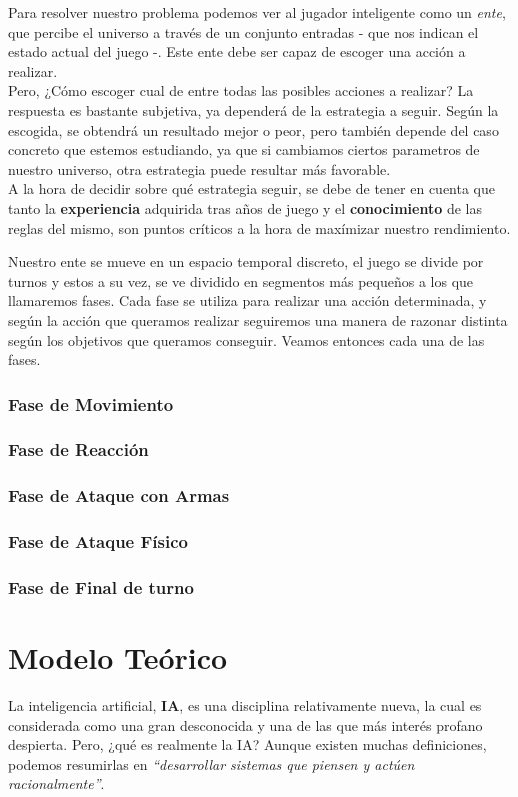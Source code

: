 \documentclass[a4paper,12pt,oneside]{book}
\begin{document}
Para resolver nuestro problema podemos ver al jugador inteligente como
un {\it ente}, que percibe el universo a través de un conjunto
entradas - que nos indican el estado actual del juego -. Este ente
debe ser capaz de escoger una acción a realizar.\\

Pero, ¿Cómo escoger cual de entre todas las posibles acciones a
realizar? La respuesta es bastante subjetiva, ya dependerá de la
estrategia a seguir. Según la escogida, se obtendrá un resultado mejor
o peor, pero también depende del caso concreto que estemos estudiando,
ya que si cambiamos ciertos parametros de nuestro universo, otra
estrategia puede resultar más favorable.\\

A la hora de decidir sobre qué estrategia seguir, se debe de tener en
cuenta que tanto la {\bf experiencia} adquirida tras años de juego y
el {\bf conocimiento} de las reglas del mismo, son puntos críticos a
la hora de maxímizar nuestro rendimiento.

Nuestro ente se mueve en un espacio temporal discreto, el juego se
divide por turnos y estos a su vez, se ve dividido en segmentos más
pequeños a los que llamaremos fases. Cada fase se utiliza para
realizar una acción determinada, y según la acción que queramos
realizar seguiremos una manera de razonar distinta según los objetivos
que queramos conseguir. Veamos entonces cada una de las fases.

\subsection{Fase de Movimiento}
\subsection{Fase de Reacción}
\subsection{Fase de Ataque con Armas}
\subsection{Fase de Ataque Físico}
\subsection{Fase de Final de turno}



\chapter{Modelo Teórico}
La inteligencia artificial, {\bf IA}, es una disciplina relativamente
nueva, la cual es considerada como una gran desconocida y una de las
que más interés profano despierta. Pero, {¿qué es realmente la IA?}
Aunque existen muchas definiciones, podemos resumirlas en {\it
  ``desarrollar sistemas que piensen y actúen racionalmente''}.\\
\end{document}
